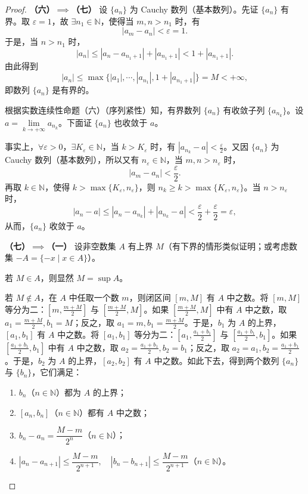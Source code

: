 \begin{proof}
\textbf{（六）$\implies$（七）} 设 $\{a_n\}$ 为 Cauchy 数列（基本数列）。先证 $\{a_n\}$ 有界。取 $\varepsilon = 1$，故 $\exists n_1 \in \mathbb{N}$，使得当 $m, n > n_1$ 时，有
\[
|a_m - a_n| < \varepsilon = 1.
\]
于是，当 $n > n_1$ 时，
\[
|a_n| \leqslant |a_n - a_{n_1+1}| + |a_{n_1+1}| < 1 + |a_{n_1+1}|.
\]
由此得到
\[
|a_n| \leqslant \max\{|a_1|, \cdots, |a_{n_1}|, 1 + |a_{n_1+1}|\} = M < +\infty,
\]
即数列 $\{a_n\}$ 是有界的。

根据实数连续性命题（六）（序列紧性）知，有界数列 $\{a_n\}$ 有收敛子列 $\{a_{n_k}\}$。设 $a = \lim\limits_{k\to+\infty} a_{n_k}$。下面证 $\{a_n\}$ 也收敛于 $a$。

事实上，$\forall \varepsilon > 0$，$\exists K_\varepsilon \in \mathbb{N}$，当 $k > K_\varepsilon$ 时，有 $|a_{n_k} - a| < \frac{\varepsilon}{2}$。又因 $\{a_n\}$ 为 Cauchy 数列（基本数列），所以又有 $n_\varepsilon \in \mathbb{N}$，当 $m, n > n_\varepsilon$ 时，
\[
|a_m - a_n| < \frac{\varepsilon}{2}.
\]
再取 $k \in \mathbb{N}$，使得 $k > \max\{K_\varepsilon, n_\varepsilon\}$，则 $n_k \geqslant k > \max\{K_\varepsilon, n_\varepsilon\}$。当 $n > n_\varepsilon$ 时，
\[
|a_n - a| \leqslant |a_n - a_{n_k}| + |a_{n_k} - a| < \frac{\varepsilon}{2} + \frac{\varepsilon}{2} = \varepsilon,
\]
从而，$\{a_n\}$ 收敛于 $a$。

\textbf{（七）$\implies$（一）} 设非空数集 $A$ 有上界 $M$（有下界的情形类似证明；或考虑数集 $-A = \{-x \mid x \in A\}$）。

若 $M \in A$，则显然 $M = \sup A$。

若 $M \notin A$，在 $A$ 中任取一个数 $m$，则闭区间 $[m, M]$ 有 $A$ 中之数。将 $[m, M]$ 等分为二：$\left[m, \frac{m+M}{2}\right]$ 与 $\left[\frac{m+M}{2}, M\right]$。如果 $\left[\frac{m+M}{2}, M\right]$ 中有 $A$ 中之数，取 $a_1 = \frac{m+M}{2}, b_1 = M$；反之，取 $a_1 = m, b_1 = \frac{m+M}{2}$。于是，$b_1$ 为 $A$ 的上界，$[a_1, b_1]$ 有 $A$ 中之数。将 $[a_1, b_1]$ 等分为二：$\left[a_1, \frac{a_1+b_1}{2}\right]$ 与 $\left[\frac{a_1+b_1}{2}, b_1\right]$。如果 $\left[\frac{a_1+b_1}{2}, b_1\right]$ 中有 $A$ 中之数，取 $a_2 = \frac{a_1+b_1}{2}, b_2 = b_1$；反之，取 $a_2 = a_1, b_2 = \frac{a_1+b_1}{2}$。于是，$b_2$ 为 $A$ 的上界，$[a_2, b_2]$ 有 $A$ 中之数。如此下去，得到两个数列 $\{a_n\}$ 与 $\{b_n\}$，它们满足：
\begin{enumerate}
  \item $b_n$（$n \in \mathbb{N}$）都为 $A$ 的上界；
  \item $[a_n, b_n]$（$n \in \mathbb{N}$）都有 $A$ 中之数；
  \item $b_n - a_n = \dfrac{M-m}{2^n}$（$n \in \mathbb{N}$）；
  \item $|a_n - a_{n+1}| \leqslant \dfrac{M-m}{2^{n+1}},\quad |b_n - b_{n+1}| \leqslant \dfrac{M-m}{2^{n+1}}$（$n \in \mathbb{N}$）。
\end{enumerate}


\end{proof}

